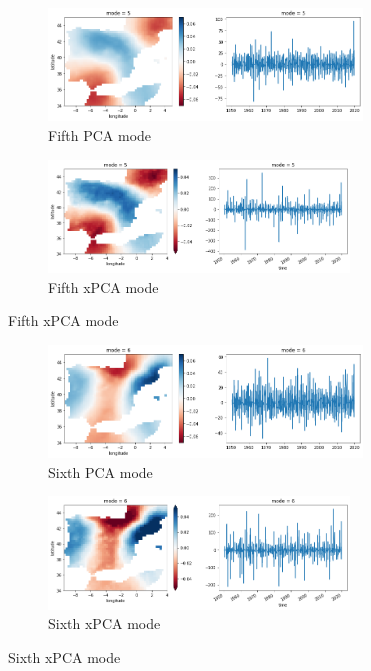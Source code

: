 \documentclass[11pt, oneside]{book}
\theoremstyle{plain}
\theoremstyle{remark}
\begin{document}
\begin{figure}[h!]
\centering
\begin{subfigure}{.5\textwidth}
    \centering
    \includegraphics[width=.95\linewidth, height=3cm]{spain-mode5}
    \caption{Fifth PCA mode}
\end{subfigure}%
\begin{subfigure}{.5\textwidth}
    \centering
    \includegraphics[width=.95\linewidth, height=3cm]{spain-tran-mode5}
    \caption{Fifth xPCA mode}
\end{subfigure}
\end{figure}
\begin{figure}[h!]
\centering
\begin{subfigure}{.5\textwidth}
    \centering
    \includegraphics[width=.95\linewidth, height=3cm]{spain-mode6}
    \caption{Sixth PCA mode}
\end{subfigure}%
\begin{subfigure}{.5\textwidth}
    \centering
    \includegraphics[width=.95\linewidth, height=3cm]{spain-tran-mode6}
    \caption{Sixth xPCA mode}
\end{subfigure}
\end{figure}
\end{document}
